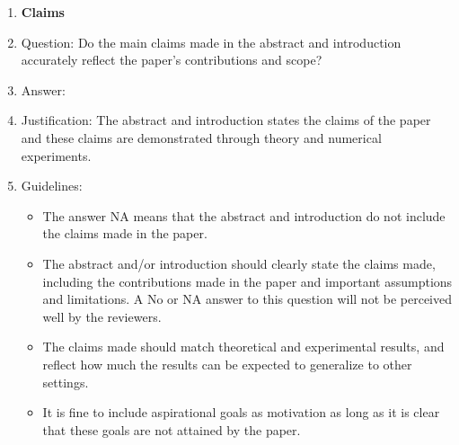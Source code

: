 \documentclass{article}
\theoremstyle{definition} \newtheorem{definition}{Definition}  \newtheorem{example}{Example}
\theoremstyle{remark} \newtheorem{remark}{Remark}
\newcounter{ct}
\begin{document}
%
% 
%


\begin{enumerate}

\item {\bf Claims}
    \item[] Question: Do the main claims made in the abstract and introduction accurately reflect the paper's contributions and scope?
    \item[] Answer: \answerYes{} %
    \item[] Justification: The abstract and introduction states the claims of the paper and these claims are demonstrated through theory and numerical experiments.
    \item[] Guidelines:
    \begin{itemize}
        \item The answer NA means that the abstract and introduction do not include the claims made in the paper.
        \item The abstract and/or introduction should clearly state the claims made, including the contributions made in the paper and important assumptions and limitations. A No or NA answer to this question will not be perceived well by the reviewers. 
        \item The claims made should match theoretical and experimental results, and reflect how much the results can be expected to generalize to other settings. 
        \item It is fine to include aspirational goals as motivation as long as it is clear that these goals are not attained by the paper. 
    \end{itemize}


\end{enumerate}
\end{document}
